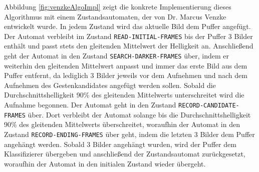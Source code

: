 \newline
\newline
Abbildung \ref{fig:venzkeAlgoImpl} zeigt die konkrete Implementierung dieses Algorithmus mit einem Zustandsautomaten, der von Dr. Marcus Venzke entwickelt wurde. In jedem Zustand wird das aktuelle Bild dem Puffer angefügt.
Der Automat verbleibt im Zustand \texttt{READ-INITIAL-FRAMES} bis der Puffer 3 Bilder enthält und passt stets den gleitenden Mittelwert der Helligkeit an. Anschließend geht der Automat in den Zustand
\texttt{SEARCH-DARKER-FRAMES} über, indem er weiterhin den gleitenden Mittelwert anpasst und immer das erste Bild aus dem Puffer entfernt, da lediglich 3 Bilder jeweils vor dem Aufnehmen und nach dem Aufnehmen des
Gestenkandidates angefügt werden sollen. Sobald die Durchschnittshelligkeit 90\% des gleitenden Mittelwerts unterschreitet wird die Aufnahme begonnen. Der Automat geht in den Zustand \texttt{RECORD-CANDIDATE-FRAMES}
über. Dort verbleibt der Automat solange bis die Durchschnittshelligkeit 90\% des gleitenden Mittelwerts überschreitet, woraufhin der Automat in den Zustand \texttt{RECORD-ENDING-FRAMES} über geht, indem die letzten 3
Bilder dem Puffer angehängt werden. Sobald 3 Bilder angehängt wurden, wird der Puffer dem Klassifizierer übergeben und anschließend der Zustandsautomat zurückgesetzt, woraufhin der Automat in den initialen
Zustand wieder übergeht.